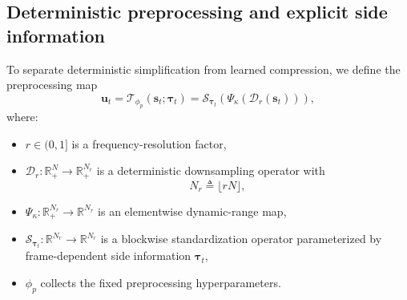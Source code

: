 \documentclass[11pt]{article}
\begin{document}
\subsection{Deterministic preprocessing and explicit side information}
To separate deterministic simplification from learned compression, we define the preprocessing map
\begin{equation}
\mathbf{u}_t
=
\mathcal{T}_{\phi_p}(\mathbf{s}_t;\boldsymbol{\tau}_t)
=
\mathcal{S}_{\boldsymbol{\tau}_t}
\!\left(
\Psi_{\kappa}\!\left(
\mathcal{D}_{r}(\mathbf{s}_t)
\right)
\right),
\end{equation}
where:
\begin{itemize}
    \item $r \in (0,1]$ is a frequency-resolution factor,
    \item $\mathcal{D}_{r} : \mathbb{R}_{+}^{N} \to \mathbb{R}_{+}^{N_r}$ is a deterministic
    downsampling operator with
    \begin{equation}
    N_r \triangleq \lfloor rN \rfloor,
    \end{equation}
    \item $\Psi_{\kappa} : \mathbb{R}_{+}^{N_r} \to \mathbb{R}^{N_r}$ is an elementwise
    dynamic-range map,
    \item $\mathcal{S}_{\boldsymbol{\tau}_t} : \mathbb{R}^{N_r} \to \mathbb{R}^{N_r}$ is a
    blockwise standardization operator parameterized by frame-dependent side information
    $\boldsymbol{\tau}_t$,
    \item $\phi_p$ collects the fixed preprocessing hyperparameters.
\end{itemize}
\end{document}
